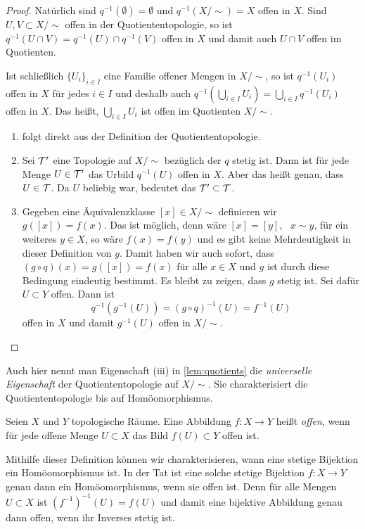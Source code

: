 \begin{proof}
Natürlich sind $q^{-1}(\emptyset) = \emptyset$ und $q^{-1}(X/{\sim}) = X$ offen
in $X$. Sind $U, V\subset X/{\sim}$ offen in der Quotiententopologie, so ist
$q^{-1}(U\cap V) = q^{-1}(U)\cap q^{-1}(V)$ offen in $X$ und damit auch $U\cap
V$ offen im Quotienten.

Ist schließlich $\{U_i\}_{i\in I}$ eine Familie offener Mengen in $X/{\sim}$, so
ist $q^{-1}(U_i)$ offen in $X$ für jedes $i\in I$ und deshalb auch $q^{-1}(\bigcup_{i\in I} U_i) =
\bigcup_{i\in I}q^{-1}(U_i)$ offen in $X$. Das heißt, $\bigcup_{i\in I} U_i$ ist
offen im Quotienten $X/{\sim}$.
\begin{enumerate}
\item folgt direkt aus der Definition der Quotiententopologie.
\item Sei $\cal T'$ eine Topologie auf $X/{\sim}$ bezüglich der $q$ stetig ist.
Dann ist für jede Menge $U\in\cal T'$ das Urbild $q^{-1}(U)$ offen in $X$. Aber
das heißt genau, dass $U\in\cal T$. Da $U$ beliebig war, bedeutet das $\cal
T'\subset\cal T$.
\item Gegeben eine Äquivalenzklasse $[x]\in X/{\sim}$ definieren wir $g([x]) =
f(x)$. Das ist möglich, denn wäre $[x] = [y]$, \ddh~$x\sim y$, für ein weiteres
 $y\in X$, so wäre $f(x) = f(y)$ und es gibt keine Mehrdeutigkeit in dieser
Definition von $g$. Damit haben wir auch sofort, dass $(g\circ q)(x) = g([x]) =
f(x)$ für alle $x\in X$ und $g$ ist durch diese Bedingung eindeutig bestimmt. Es
bleibt zu zeigen, dass $g$ stetig ist. Sei dafür $U\subset Y$ offen. Dann ist
\[
q^{-1}(g^{-1}(U)) = (g\circ q)^{-1}(U) = f^{-1}(U)
\]
offen in $X$ und damit $g^{-1}(U)$ offen in $X/{\sim}$.\qedhere
\end{enumerate}
\end{proof}
Auch hier nennt man Eigenschaft (iii) in \autoref{lem:quotients} die
\emph{universelle Eigenschaft} der Quotiententopologie auf $X/{\sim}$. Sie
charakterisiert die Quotiententopologie bis auf Homöomorphismus.
\begin{definition}
Seien $X$ und $Y$ topologische Räume. Eine Abbildung $f\colon X\to Y$ heißt
\emph{offen}, wenn für jede offene Menge $U\subset X$ das Bild $f(U)\subset Y$
offen ist.
\end{definition}
Mithilfe dieser Definition können wir charakterisieren, wann eine stetige
Bijektion ein Homöomorphismus ist. In der Tat ist eine solche stetige Bijektion
$f\colon X\to Y$ genau dann ein Homöomorphismus, wenn sie offen ist. Denn für
alle Mengen $U\subset X$ ist $(f^{-1})^{-1}(U) = f(U)$ und damit eine bijektive Abbildung
genau dann offen, wenn ihr Inverses stetig ist.

